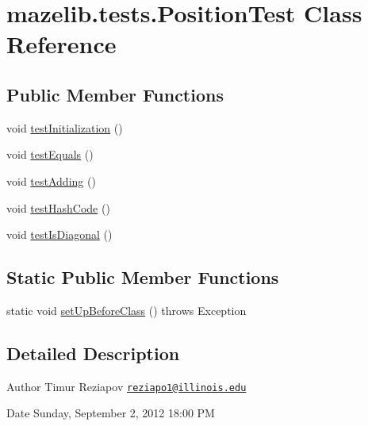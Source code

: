 \hypertarget{classmazelib_1_1tests_1_1_position_test}{\section{mazelib.\-tests.\-Position\-Test Class Reference}
\label{classmazelib_1_1tests_1_1_position_test}
}
\subsection*{Public Member Functions}
\begin{DoxyCompactItemize}
\item 
void \hyperlink{classmazelib_1_1tests_1_1_position_test_a75ca6a101b6c09fe8e66b990c6b49970}{test\-Initialization} ()
\item 
void \hyperlink{classmazelib_1_1tests_1_1_position_test_a729b4a25a086a80bb92e0dab0c36ccf5}{test\-Equals} ()
\item 
void \hyperlink{classmazelib_1_1tests_1_1_position_test_ae175b6078d65e31ec6757ad1b7de8d3d}{test\-Adding} ()
\item 
void \hyperlink{classmazelib_1_1tests_1_1_position_test_a52a276da611b4028724005e2a3f7ea47}{test\-Hash\-Code} ()
\item 
void \hyperlink{classmazelib_1_1tests_1_1_position_test_a594884917246687937223fc4e95dddcb}{test\-Is\-Diagonal} ()
\end{DoxyCompactItemize}
\subsection*{Static Public Member Functions}
\begin{DoxyCompactItemize}
\item 
static void \hyperlink{classmazelib_1_1tests_1_1_position_test_ac99f460e040d9fe31185f26ef6db4894}{set\-Up\-Before\-Class} ()  throws Exception  	
\end{DoxyCompactItemize}


\subsection{Detailed Description}
\begin{DoxyAuthor}{Author}
Timur Reziapov \href{mailto:reziapo1@illinois.edu}{\tt reziapo1@illinois.\-edu} 
\end{DoxyAuthor}
\begin{DoxyDate}{Date}
Sunday, September 2, 2012 18\-:00 P\-M 
\end{DoxyDate}


